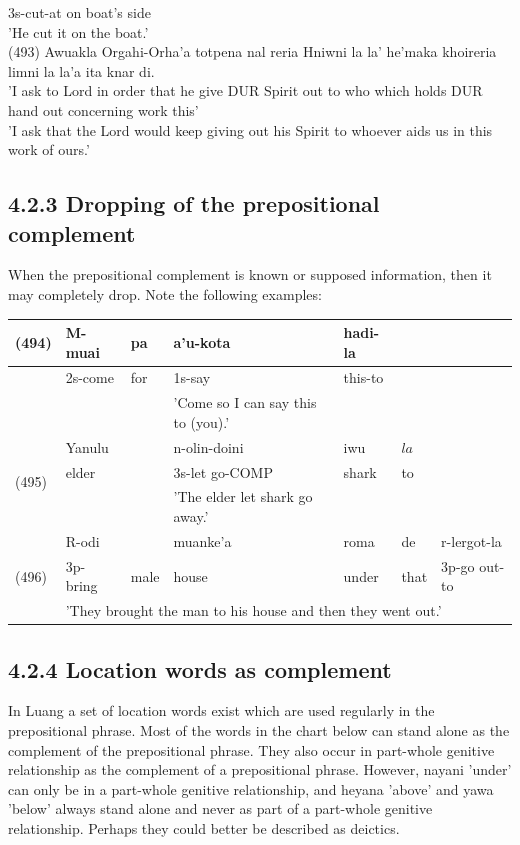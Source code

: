 \documentclass[10pt]{article}
\begin{document}
3s-cut-at on boat's side\\
'He cut it on the boat.'\\
(493) Awuakla Orgahi-Orha'a totpena nal reria Hniwni la la' he'maka khoireria limni la la'a ita knar di.\\
'I ask to Lord in order that he give DUR Spirit out to who which holds DUR hand out concerning work this'\\
'I ask that the Lord would keep giving out his Spirit to whoever aids us in this work of ours.'

\subsection*{4.2.3 Dropping of the prepositional complement}
When the prepositional complement is known or supposed information, then it may completely drop. Note the following examples:

\begin{center}
\begin{tabular}{|l|l|l|l|l|l|l|}
\hline
\multirow[t]{3}{*}{(494)} & M-muai & pa & a'u-kota & hadi-la & \multirow{3}{*}{} & \multirow{6}{*}{} \\
\hline
 & 2s-come & for & 1s-say & this-to &  &  \\
\hline
 &  &  & 'Come so I can say this to (you).' &  &  &  \\
\hline
\multirow[t]{3}{*}{(495)} & Yanulu &  & n-olin-doini & iwu & \(l a\) &  \\
\hline
 & elder &  & 3s-let go-COMP & shark & to &  \\
\hline
 &  &  & 'The elder let shark go away.' &  &  &  \\
\hline
\multirow[t]{3}{*}{(496)} & R-odi &  & muanke'a & roma & de & r-lergot-la \\
\hline
 & 3p-bring & male & house & under & that & 3p-go out-to \\
\hline
 & \multicolumn{6}{|l|}{'They brought the man to his house and then they went out.'} \\
\hline
\end{tabular}
\end{center}

\subsection*{4.2.4 Location words as complement}
In Luang a set of location words exist which are used regularly in the prepositional phrase. Most of the words in the chart below can stand alone as the complement of the prepositional phrase. They also occur in part-whole genitive relationship as the complement of a prepositional phrase. However, nayani 'under' can only be in a part-whole genitive relationship, and heyana 'above' and yawa 'below' always stand alone and never as part of a part-whole genitive relationship. Perhaps they could better be described as deictics.
\end{document}
